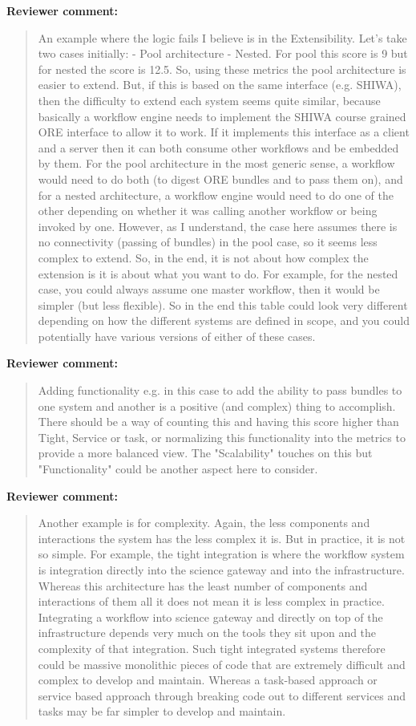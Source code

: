 \documentclass[a4]{letter}
\newenvironment{review}%
{\textbf{Reviewer comment:}\begin{quote}}%
{\end{quote}}%
\begin{document}
\begin{letter}{}
\begin{review}
An example where the logic fails I believe is in the Extensibility. Let's take two cases initially:
-	Pool architecture
-	Nested.
For pool this score is 9 but for nested the score is 12.5. So, using these metrics the pool architecture is easier to extend.  But, if this is based on the same interface (e.g. SHIWA), then the difficulty to extend each system seems quite similar, because basically a workflow engine needs to implement the SHIWA course grained ORE interface to allow it to work. If it implements this interface as a client and a server then it can both consume other workflows and be embedded by them. For the pool architecture in the most generic sense, a workflow would need to do both (to digest ORE bundles and to pass them on), and for a nested architecture, a workflow engine would need to do one of the other depending on whether it was calling another workflow or being invoked by one.  However, as I understand, the case here assumes there is no connectivity (passing of bundles) in the pool case, so it seems less complex to extend. So, in the end, it is not about how complex the extension is
it is about what you want to do.  For example, for the nested case, you could always assume one master workflow, then it would be simpler (but less flexible). So in the end this table could look very different depending on how the different systems are defined in scope, and you could potentially have various versions of either of these cases. 
\end{review}

\begin{review}
Adding functionality e.g. in this case to add the ability to pass bundles to one system and another is a positive (and complex) thing to accomplish. There should be a way of counting this and having this score higher than Tight, Service or task, or normalizing this functionality into the metrics to provide a more balanced view. The "Scalability" touches on this but "Functionality" could be another aspect here to consider.
\end{review}

\begin{review}
Another example is for complexity.  Again, the less components and interactions the system has the less complex it is. But in practice, it is not so simple. For example, the tight integration is where the workflow system is integration directly into the science gateway and into the infrastructure. Whereas this architecture has the least number of components and interactions of them all it does not mean it is less complex in practice. Integrating a workflow into science gateway and directly on top of the infrastructure depends very much on the tools they sit upon and the complexity of that integration. Such tight integrated systems therefore could be massive monolithic pieces of code that are extremely difficult and complex to develop and maintain.  Whereas a task-based approach or service based approach through breaking code out to different services and tasks may be far simpler to develop and maintain. 
\end{review}


\end{letter}
\end{document}
